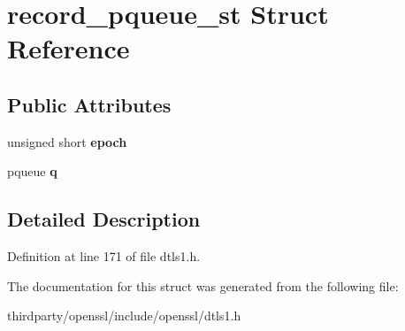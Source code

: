 \hypertarget{structrecord__pqueue__st}{}\section{record\+\_\+pqueue\+\_\+st Struct Reference}
\label{structrecord__pqueue__st}
\subsection*{Public Attributes}
\begin{DoxyCompactItemize}
\item 
\mbox{\label{structrecord__pqueue__st_afac67173059e6a13ddfaad940046c5b4}} 
unsigned short {\bfseries epoch}
\item 
\mbox{\label{structrecord__pqueue__st_a5c5204a38f914cdd4d592cc7d591b83e}} 
pqueue {\bfseries q}
\end{DoxyCompactItemize}


\subsection{Detailed Description}


Definition at line 171 of file dtls1.\+h.



The documentation for this struct was generated from the following file\+:\begin{DoxyCompactItemize}
\item 
thirdparty/openssl/include/openssl/dtls1.\+h\end{DoxyCompactItemize}

